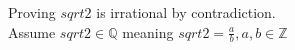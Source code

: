 \documentclass{article}
\begin{document}
Proving $sqrt{2}$ is irrational by contradiction. \\
Assume $sqrt{2} \in \mathbb{Q}$ meaning $sqrt{2} = \frac{a}{b}, a,b \in \mathbb{Z}$
\end{document}
